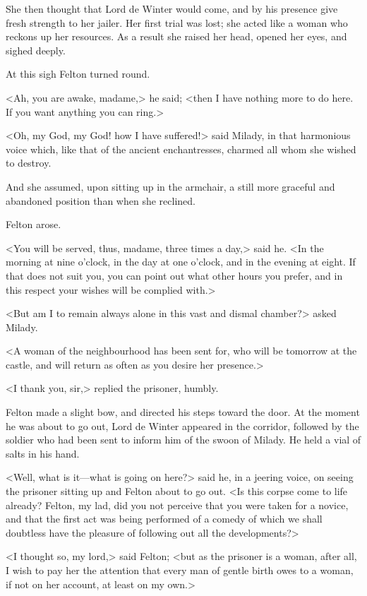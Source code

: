 She then thought that Lord de Winter would come, and by his presence give fresh strength to her jailer. Her first trial was lost; she acted like a woman who reckons up her resources. As a result she raised her head, opened her eyes, and sighed deeply. 

At this sigh Felton turned round. 

<Ah, you are awake, madame,> he said; <then I have nothing more to do here. If you want anything you can ring.> 

<Oh, my God, my God! how I have suffered!> said Milady, in that harmonious voice which, like that of the ancient enchantresses, charmed all whom she wished to destroy. 

And she assumed, upon sitting up in the armchair, a still more graceful and abandoned position than when she reclined. 

Felton arose. 

<You will be served, thus, madame, three times a day,> said he. <In the morning at nine o'clock, in the day at one o'clock, and in the evening at eight. If that does not suit you, you can point out what other hours you prefer, and in this respect your wishes will be complied with.> 

<But am I to remain always alone in this vast and dismal chamber?> asked Milady. 

<A woman of the neighbourhood has been sent for, who will be tomorrow at the castle, and will return as often as you desire her presence.> 

<I thank you, sir,> replied the prisoner, humbly. 

Felton made a slight bow, and directed his steps toward the door. At the moment he was about to go out, Lord de Winter appeared in the corridor, followed by the soldier who had been sent to inform him of the swoon of Milady. He held a vial of salts in his hand. 

<Well, what is it—what is going on here?> said he, in a jeering voice, on seeing the prisoner sitting up and Felton about to go out. <Is this corpse come to life already? Felton, my lad, did you not perceive that you were taken for a novice, and that the first act was being performed of a comedy of which we shall doubtless have the pleasure of following out all the developments?> 

<I thought so, my lord,> said Felton; <but as the prisoner is a woman, after all, I wish to pay her the attention that every man of gentle birth owes to a woman, if not on her account, at least on my own.> 

